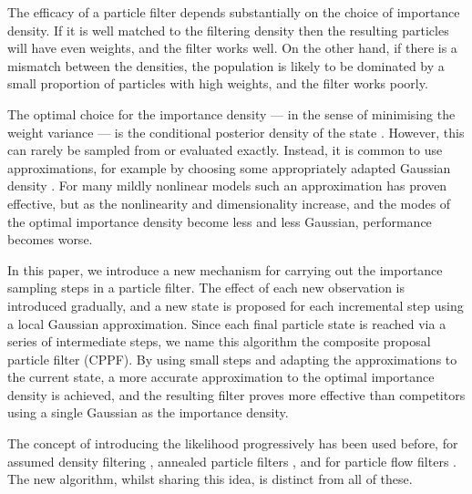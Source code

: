 \documentclass[conference]{IEEEtran}
\begin{document}
The efficacy of a particle filter depends substantially on the choice of importance density. If it is well matched to the filtering density then the resulting particles will have even weights, and the filter works well. On the other hand, if there is a mismatch between the densities, the population is likely to be dominated by a small proportion of particles with high weights, and the filter works poorly.

The optimal choice for the importance density --- in the sense of minimising the weight variance --- is the conditional posterior density of the state \cite{Doucet2000a}. However, this can rarely be sampled from or evaluated exactly. Instead, it is common to use approximations, for example by choosing some appropriately adapted Gaussian density \cite{Doucet2000a,Merwe2000}. For many mildly nonlinear models such an approximation has proven effective, but as the nonlinearity and dimensionality increase, and the modes of the optimal importance density become less and less Gaussian, performance becomes worse.

In this paper, we introduce a new mechanism for carrying out the importance sampling steps in a particle filter. The effect of each new observation is introduced gradually, and a new state is proposed for each incremental step using a local Gaussian approximation. Since each final particle state is reached via a series of intermediate steps, we name this algorithm the composite proposal particle filter (CPPF). By using small steps and adapting the approximations to the current state, a more accurate approximation to the optimal importance density is achieved, and the resulting filter proves more effective than competitors using a single Gaussian as the importance density.

The concept of introducing the likelihood progressively has been used before, for assumed density filtering \cite{Hanebeck2003,Hagmar2011}, annealed particle filters \cite{Godsill2001b,Gall2007,Deutscher2000}, and for particle flow filters \cite{Daum2011d}. The new algorithm, whilst sharing this idea, is distinct from all of these.

\end{document}
